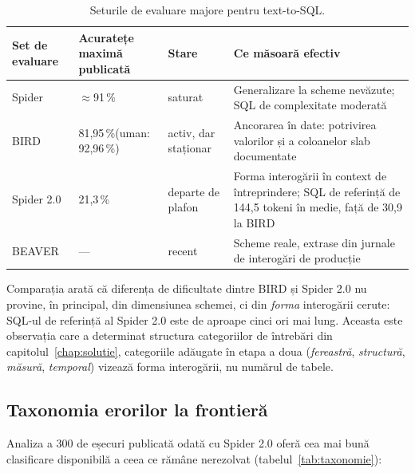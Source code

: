 \documentclass[12pt,a4paper]{report}
\newcommand{\hd}[1]{\textbf{#1}}
\begin{document}
\begin{table}[H]
\centering
\caption{Seturile de evaluare majore pentru text-to-SQL.}
\label{tab:bancuri}
\footnotesize
\begin{tabularx}{\textwidth}{@{}p{2.0cm} p{2.6cm} p{2.0cm} L@{}}
\toprule
\hd{Set de evaluare} & \hd{Acuratețe maximă publicată} & \hd{Stare} &
\hd{Ce măsoară efectiv} \\
\midrule
Spider \cite{spider} & $\approx$91\,\% & saturat &
Generalizare la scheme nevăzute; SQL de complexitate moderată \\
BIRD \cite{bird} & 81,95\,\%\footnotemark[1] (uman: 92,96\,\%) & activ,
dar staționar &
Ancorarea în date: potrivirea valorilor și a coloanelor slab documentate \\
Spider 2.0 \cite{spider2} & 21,3\,\% & departe de plafon &
Forma interogării în context de întreprindere; SQL de referință de 144,5
tokeni în medie, față de 30,9 la BIRD \\
BEAVER \cite{beaver} & --- & recent &
Scheme reale, extrase din jurnale de interogări de producție \\
\bottomrule
\end{tabularx}
\end{table}

Comparația arată că diferența de dificultate dintre BIRD și Spider 2.0 nu
provine, în principal, din dimensiunea schemei, ci din \emph{forma}
interogării cerute: SQL-ul de referință al Spider 2.0 este de aproape cinci
ori mai lung. Aceasta este observația care a determinat structura categoriilor
de întrebări din capitolul~\ref{chap:solutie}, categoriile adăugate în etapa a doua
(\emph{fereastră}, \emph{structură}, \emph{măsură}, \emph{temporal}) vizează
forma interogării, nu numărul de tabele.

\subsection{Taxonomia erorilor la frontieră}

Analiza a 300 de eșecuri publicată odată cu Spider 2.0 \cite{spider2} oferă
cea mai bună clasificare disponibilă a ceea ce rămâne nerezolvat (tabelul~\ref{tab:taxonomie}):
\end{document}
